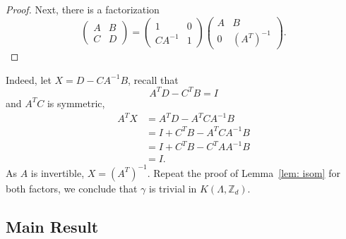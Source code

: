 \documentclass{article}
\theoremstyle{definition}
\newcommand{\ZZ}{{\mathbb Z}}
\begin{document}
\begin{proof}
    Next, there is a factorization 
    $$\begin{pmatrix}
        A & B\\
        C & D
    \end{pmatrix}=\begin{pmatrix}
        1 & 0\\
        CA^{-1} & 1
    \end{pmatrix}
    \begin{pmatrix}
        A & B\\
        0 & (A^T)^{-1}
    \end{pmatrix}.$$
\end{proof}
Indeed, let $X=D-CA^{-1}B$, recall that $$A^TD-C^TB=I$$ and $A^TC$ is symmetric,  
\begin{align*}
   A^{T}X&=A^TD-A^TCA^{-1}B \\
   &= I+C^TB-A^TCA^{-1}B\\
   &=I+C^TB-C^TAA^{-1}B\\
   &=I.
\end{align*}
As $A$ is invertible, $X=(A^T)^{-1}$. Repeat the proof of Lemma~\ref{lem: isom} for both factors, we conclude that $\gamma$ is trivial in $K(\Lambda, \ZZ_d)$.


\subsection{Main Result}
\end{document}
